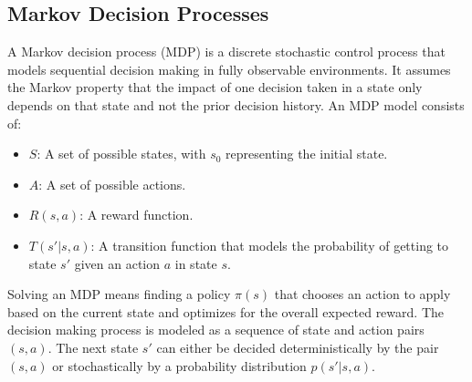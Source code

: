 \subsection{Markov Decision Processes}
A Markov decision process (MDP) is a discrete stochastic control process that models sequential decision making in fully observable environments. It assumes the Markov property that the impact of one decision taken in a state only depends on that state and not the prior decision history. 
An MDP model consists of:
\begin{itemize}
    \item $S$: A set of possible states, with $s_0$ representing the initial state. 
    \item $A$: A set of possible actions. 
    \item $R(s, a)$: A reward function. 
    \item $T(s' | s, a)$: A transition function that models the probability of getting to state $s'$ given an action $a$ in state $s$. 
\end{itemize}
Solving an MDP means finding a policy $\pi(s)$ that chooses an action to apply based on the current state and optimizes for the overall expected reward. The decision making process is modeled as a sequence of state and action pairs $(s, a)$. The next state $s'$ can either be decided deterministically by the pair $(s, a)$ or stochastically by a probability distribution $p(s'|s, a)$.  



